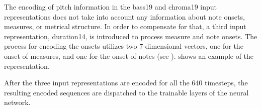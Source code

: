 
The encoding of pitch information in the \gls{bass19} and
\gls{chroma19} input representations does not take into
account any information about note onsets, measures, or
metrical structure. In order to compensate for that, a third
input representation, \gls{duration14}, is introduced to
process measure and note onsets. The process for encoding
the onsets utilizes two 7-dimensional vectors, one for the
onset of measures, and one for the onset of notes (see
). 
shows an example of the representation.


After the three input representations are encoded for all
the 640 timesteps, the resulting encoded sequences are
dispatched to the trainable layers of the neural network.
